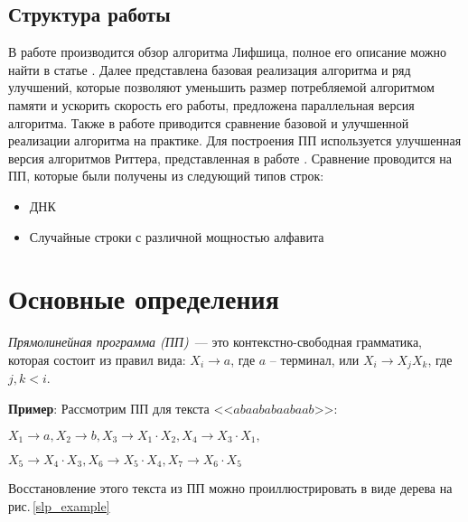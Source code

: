 \documentclass[14pt]{article}
\begin{document}
\subsection{Структура работы}
В работе производится обзор алгоритма Лифшица, полное его описание можно найти в статье \cite{Lifshits}. Далее представлена базовая реализация алгоритма и ряд улучшений, которые позволяют уменьшить размер потребляемой алгоритмом памяти и ускорить скорость его работы, предложена параллельная версия алгоритма. Также в работе приводится сравнение базовой и улучшенной реализации алгоритма на практике. Для построения ПП используется улучшенная версия алгоритмов Риттера, представленная в работе \cite{ModernRytterAlgorithm}. Сравнение проводится на ПП, которые были получены из следующий типов строк:
\begin{itemize}
\item ДНК
\item Случайные строки с различной мощностью алфавита
\end{itemize}

\newpage
\section{Основные определения}
\emph{Прямолинейная программа (ПП)}~--- это контекстно-свободная грамматика, которая состоит из правил вида: $X_i \to a$, где $a$ -- терминал, или $X_i \to X_j X_k$, где $j, k < i$.

{\bf Пример}: Рассмотрим ПП для текста <<$abaababaabaab$>>:

\begin{center}
$X_1 \to a, X_2 \to b, X_3 \to X_1\cdot X_2, X_4 \to X_3\cdot X_1,$

$X_5 \to X_4\cdot X_3, X_6 \to X_5\cdot X_4, X_7 \to X_6\cdot X_5$
\end{center}

Восстановление этого текста из ПП можно проиллюстрировать в виде дерева на рис.\,\ref{slp_example}
\end{document}
